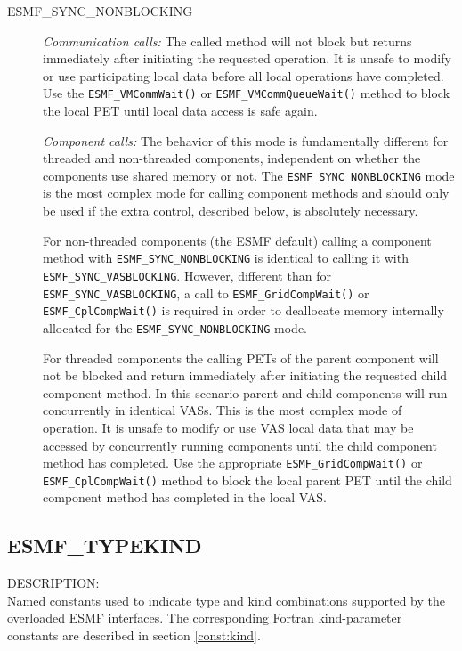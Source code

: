 \begin{description}
\item [ESMF\_SYNC\_NONBLOCKING]
         {\em Communication calls:} The called method will not block but 
         returns immediately after initiating the requested operation. It is
         unsafe to modify or use participating local data before all local
         operations have completed. Use the {\tt ESMF\_VMCommWait()} or
         {\tt ESMF\_VMCommQueueWait()} method to block the local PET until
         local data access is safe again. 

         {\em Component calls:} The behavior of this mode is fundamentally
         different for threaded and non-threaded components,
         independent on whether the components use shared memory or not.
         The {\tt ESMF\_SYNC\_NONBLOCKING} mode is the most complex mode for
         calling component methods and should only be used if the extra
         control, described below, is absolutely necessary.
         
         For non-threaded components (the ESMF default)
         calling a component method with {\tt ESMF\_SYNC\_NONBLOCKING}
         is identical to calling it with {\tt ESMF\_SYNC\_VASBLOCKING}. However,
         different than for {\tt ESMF\_SYNC\_VASBLOCKING}, a call to
         {\tt ESMF\_GridCompWait()} or {\tt ESMF\_CplCompWait()} is
         required in order to deallocate memory internally allocated for the
         {\tt ESMF\_SYNC\_NONBLOCKING} mode.
         
         For threaded components the calling PETs
         of the parent component will not be blocked and return immediately
         after initiating the requested child component method. In this
         scenario parent and child components will run concurrently in
         identical VASs. This is the most complex mode of operation.
         It is unsafe to modify or use VAS local data that
         may be accessed by concurrently running components until the child
         component method has completed. Use the appropriate
         {\tt ESMF\_GridCompWait()} or {\tt ESMF\_CplCompWait()} method to
         block the local parent PET until the child component method has
         completed in the local VAS.
\end{description}

\subsection{ESMF\_TYPEKIND}
\label{const:typekind}

{\sf DESCRIPTION:\\}
Named constants used to indicate type and kind combinations supported by the
overloaded ESMF interfaces. The corresponding Fortran kind-parameter constants
are described in section \ref{const:kind}.

